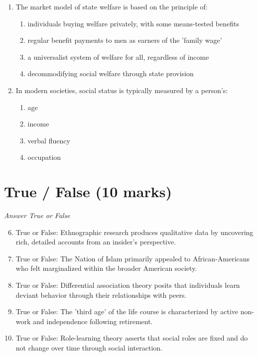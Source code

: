 \documentclass[12pt]{article}
\begin{document}
\begin{enumerate}[label=\arabic*.]
\item The market model of state welfare is based on the principle of:
\begin{enumerate}[label=(\alph*)]
    \item individuals buying welfare privately, with some means-tested benefits
    \item regular benefit payments to men as earners of the 'family wage'
    \item a universalist system of welfare for all, regardless of income
    \item decommodifying social welfare through state provision
\end{enumerate}
\item In modern societies, social status is typically measured by a person's:
\begin{enumerate}[label=(\alph*)]
    \item age
    \item income
    \item verbal fluency
    \item occupation
\end{enumerate}
\end{enumerate}

\section*{True / False (10 marks)}
\textit{Answer True or False}
\begin{enumerate}[label=\arabic*.]
\setcounter{enumi}{5}
\item True or False: Ethnographic research produces qualitative data by uncovering rich, detailed accounts from an insider's perspective.
\item True or False: The Nation of Islam primarily appealed to African-Americans who felt marginalized within the broader American society.
\item True or False: Differential association theory posits that individuals learn deviant behavior through their relationships with peers.
\item True or False: The 'third age' of the life course is characterized by active non-work and independence following retirement.
\item True or False: Role-learning theory asserts that social roles are fixed and do not change over time through social interaction.
\end{enumerate}
\end{document}
